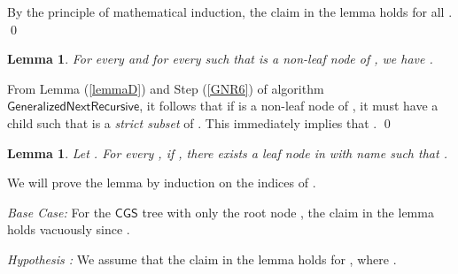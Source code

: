 \documentclass[3p]{elsarticle}
\newtheorem{lemma}[theorem]{Lemma}
\newcommand{\CGS}{\ensuremath{\textsf{CGS }}}
\newcommand{\algo}[1]{\ensuremath{\textsf{{#1}}}}
\begin{document}
By the principle of mathematical induction, the claim in the lemma
holds for all . \qed

\begin{lemma}\label{lemmaA}
For every  and for every  such that  is a
non-leaf node of , we have .
\end{lemma}
 From Lemma (\ref{lemmaD}) and Step (\ref{GNR6})
of algorithm \algo{GeneralizedNextRecursive}, it follows that if 
is a non-leaf node of , it must have a child  such that
 is a \emph{strict subset} of .  This immediately
implies that . \qed

\begin{lemma}
\label{lemmaB}
Let .  For every , if ,
there exists a leaf node  in  with name  such
that .
\end{lemma}
We will prove the lemma by induction on the indices of .

\noindent \emph{Base Case:} For the \CGS tree  with only the root
node , the claim in the lemma holds vacuously since .

\noindent \emph{Hypothesis :} We assume that the claim in the lemma
holds for , where .
\end{document}
